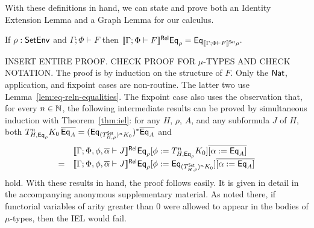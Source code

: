 \documentclass{lmcs}
\theoremstyle{plain}\newtheorem{satz}[thm]{Satz}
\newcommand{\set}{\mathsf{Set}}
\begin{document}
With these definitions in hand, we can state and prove both an
Identity Extension Lemma and a Graph Lemma for our calculus.
\begin{thm}[IEL]\label{thm:iel}
If $\rho : \mathsf{SetEnv}$ and $\Gamma; \Phi \vdash F$ then $\relsem{\Gamma;
  \Phi \vdash F} \Eq_\rho = \Eq_{\setsem{\Gamma; \Phi \vdash F}\rho}$.
\end{thm}
{\color{red} INSERT ENTIRE PROOF. CHECK PROOF FOR $\mu$-TYPES AND
  CHECK NOTATION.}
The proof is by induction on the structure of $F$. Only the $\mathsf{Nat}$,
application, and fixpoint cases are non-routine. The latter two use
Lemma~\ref{lem:eq-reln-equalities}. The fixpoint case also uses the
observation that, for every $n \in \mathbb{N}$, the following intermediate
results can be proved by simultaneous induction with
Theorem~\ref{thm:iel}: for any $H$, $\rho$, $A$, and any subformula
$J$ of $H$, both
$T^n_{H,\Eq_{\rho}} K_0\, \ol{\Eq_A}
= (\Eq_{(T^\set_{H,\rho})^n K_0})^*
\ol{\Eq_A}$\;
and\;
\[\begin{array}{ll}
&  \relsem{\Gamma; \Phi, \phi, \ol{\alpha} \vdash J} \Eq_{\rho} [\phi
  := T^{n}_{H,\Eq_{\rho}} K_0] \overline{[\alpha := \Eq_A]}\\
=  &
\relsem{\Gamma; \Phi, \phi,
  \ol{\alpha} \vdash J} \Eq_{\rho} [\phi := \Eq_{(T^\set_{H,\rho})^n K_0}]
\overline{[\alpha := \Eq_A]}
\end{array}\]
hold. With these results in hand, the proof follows easily. It is
given in detail in the accompanying anonymous supplementary
material. As noted there, if functorial variables of arity greater
than $0$ were allowed to appear in the bodies of $\mu$-types, then the
IEL would fail.
\end{document}
